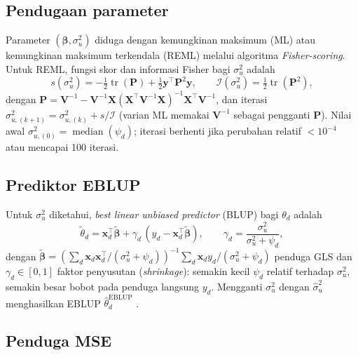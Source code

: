 \documentclass[11pt,a4paper]{article}
\theoremstyle{definition}
\begin{document}
\subsection{Pendugaan parameter}

Parameter $(\boldsymbol{\beta}, \sigma_u^2)$ diduga dengan kemungkinan maksimum (ML)
atau kemungkinan maksimum terkendala (REML) melalui algoritma \emph{Fisher-scoring}.
Untuk REML, fungsi skor dan informasi Fisher bagi $\sigma_u^2$ adalah
\begin{equation}
  s(\sigma_u^2) = -\tfrac{1}{2}\operatorname{tr}(\mathbf{P})
      + \tfrac{1}{2}\mathbf{y}^{\top}\mathbf{P}^2\mathbf{y},
  \qquad
  \mathcal{I}(\sigma_u^2) = \tfrac{1}{2}\operatorname{tr}(\mathbf{P}^2),
\end{equation}
dengan $\mathbf{P} = \mathbf{V}^{-1} - \mathbf{V}^{-1}\mathbf{X}
(\mathbf{X}^{\top}\mathbf{V}^{-1}\mathbf{X})^{-1}\mathbf{X}^{\top}\mathbf{V}^{-1}$,
dan iterasi $\sigma_{u,(k+1)}^2 = \sigma_{u,(k)}^2 + s/\mathcal{I}$
(varian ML memakai $\mathbf{V}^{-1}$ sebagai pengganti $\mathbf{P}$).
Nilai awal $\sigma_{u,(0)}^2 = \operatorname{median}(\psi_d)$; iterasi berhenti jika
perubahan relatif $< 10^{-4}$ atau mencapai 100 iterasi.

\subsection{Prediktor EBLUP}

Untuk $\sigma_u^2$ diketahui, \emph{best linear unbiased predictor} (BLUP) bagi $\theta_d$ adalah
\begin{equation}
  \tilde{\theta}_d = \mathbf{x}_d^{\top}\tilde{\boldsymbol{\beta}}
      + \gamma_d\,(y_d - \mathbf{x}_d^{\top}\tilde{\boldsymbol{\beta}}),
  \qquad
  \gamma_d = \frac{\sigma_u^2}{\sigma_u^2 + \psi_d},
  \label{eq:fh-blup}
\end{equation}
dengan $\tilde{\boldsymbol{\beta}} =
(\sum_d \mathbf{x}_d\mathbf{x}_d^{\top}/(\sigma_u^2+\psi_d))^{-1}
 \sum_d \mathbf{x}_d y_d/(\sigma_u^2+\psi_d)$ penduga GLS dan
$\gamma_d \in [0,1]$ faktor penyusutan (\emph{shrinkage}): semakin kecil $\psi_d$
relatif terhadap $\sigma_u^2$, semakin besar bobot pada penduga langsung $y_d$.
Mengganti $\sigma_u^2$ dengan $\hat{\sigma}_u^2$ menghasilkan EBLUP
$\hat{\theta}_d^{\mathrm{EBLUP}}$ \cite{rao2015}.

\subsection{Penduga MSE}
\end{document}

